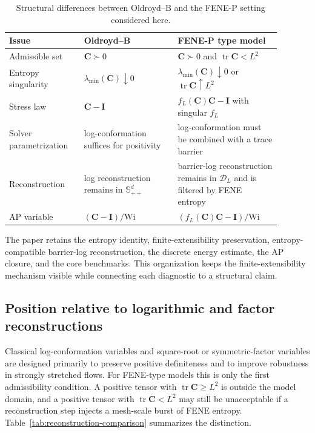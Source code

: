 ﻿\documentclass[11pt]{amsart}
\newcommand{\CC}{\bm C}
\newcommand{\Id}{\bm I}
\newcommand{\Wi}{\mathrm{Wi}}
\newcommand{\calD}{\mathcal D}
\newcommand{\tr}{\operatorname{tr}}
\begin{document}
\begin{table}[htbp]
\centering
\caption{Structural differences between Oldroyd--B and the FENE-P setting considered here.}
\label{tab:oldroyd-fene-position}
\small
\begin{tabular}{p{0.24\linewidth}p{0.31\linewidth}p{0.34\linewidth}}
\toprule
Issue & Oldroyd--B & FENE-P type model \\
\midrule
Admissible set & $\CC\succ0$ & $\CC\succ0$ and $\tr\CC<L^2$ \\
Entropy singularity & $\lambda_{\min}(\CC)\downarrow0$ & $\lambda_{\min}(\CC)\downarrow0$ or $\tr\CC\uparrow L^2$ \\
Stress law & $\CC-\Id$ & $f_L(\CC)\CC-\Id$ with singular $f_L$ \\
Solver parametrization & log-conformation suffices for positivity & log-conformation must be combined with a trace barrier \\
Reconstruction & log reconstruction remains in $\mathbb S_{++}^d$ & barrier-log reconstruction remains in $\calD_L$ and is filtered by FENE entropy \\
AP variable & $(\CC-\Id)/\Wi$ & $(f_L(\CC)\CC-\Id)/\Wi$ \\
\bottomrule
\end{tabular}
\end{table}

The paper retains the entropy identity, finite-extensibility preservation, entropy-compatible barrier-log reconstruction, the discrete energy estimate, the AP closure, and the core benchmarks.  This organization keeps the finite-extensibility mechanism visible while connecting each diagnostic to a structural claim.

\subsection*{Position relative to logarithmic and factor reconstructions}

Classical log-conformation variables \cite{FattalKupferman2004,FattalKupferman2005,HulsenFattalKupferman2005} and square-root or symmetric-factor variables \cite{BalciThomasesRenardy2011} are designed primarily to preserve positive definiteness and to improve robustness in strongly stretched flows.  For FENE-type models this is only the first admissibility condition.  A positive tensor with $\tr\CC\ge L^2$ is outside the model domain, and a positive tensor with $\tr\CC<L^2$ may still be unacceptable if a reconstruction step injects a mesh-scale burst of FENE entropy.  Table~\ref{tab:reconstruction-comparison} summarizes the distinction.
\end{document}
